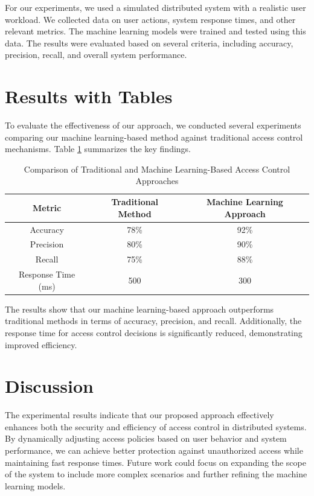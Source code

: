 \documentclass[12pt]{article}
\begin{document}
For our experiments, we used a simulated distributed system with a realistic user workload. We collected data on user actions, system response times, and other relevant metrics. The machine learning models were trained and tested using this data. The results were evaluated based on several criteria, including accuracy, precision, recall, and overall system performance.

\section{Results with Tables}
To evaluate the effectiveness of our approach, we conducted several experiments comparing our machine learning-based method against traditional access control mechanisms. Table \ref{tab:results} summarizes the key findings.

\begin{table}[h]
    \centering
    \begin{tabular}{|c|c|c|}
        \hline
        \textbf{Metric} & \textbf{Traditional Method} & \textbf{Machine Learning Approach} \\
        \hline
        Accuracy & 78\% & 92\% \\
        Precision & 80\% & 90\% \\
        Recall & 75\% & 88\% \\
        Response Time (ms) & 500 & 300 \\
        \hline
    \end{tabular}
    \caption{Comparison of Traditional and Machine Learning-Based Access Control Approaches}
    \label{tab:results}
\end{table}

The results show that our machine learning-based approach outperforms traditional methods in terms of accuracy, precision, and recall. Additionally, the response time for access control decisions is significantly reduced, demonstrating improved efficiency.

\section{Discussion}
The experimental results indicate that our proposed approach effectively enhances both the security and efficiency of access control in distributed systems. By dynamically adjusting access policies based on user behavior and system performance, we can achieve better protection against unauthorized access while maintaining fast response times. Future work could focus on expanding the scope of the system to include more complex scenarios and further refining the machine learning models.
\end{document}
